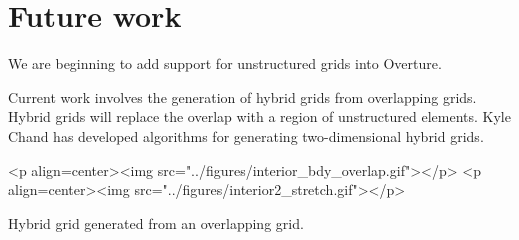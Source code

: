 \documentclass{article}
\begin{document}
\section{Future work}


  We are beginning to add support for unstructured grids into Overture. 

   Current work involves the generation of hybrid grids from overlapping grids. Hybrid grids
will replace the overlap with a region of unstructured elements. Kyle Chand has developed 
algorithms for generating two-dimensional hybrid grids. 


\begin{rawhtml}
<p align=center><img src="../figures/interior_bdy_overlap.gif"></p>
<p align=center><img src="../figures/interior2_stretch.gif"></p>
\end{rawhtml}
\begin{flushleft}
{\LARGE Hybrid grid generated from an overlapping grid.} \\
~ \\
~ \\
~ \\
\end{flushleft}



\end{document}

